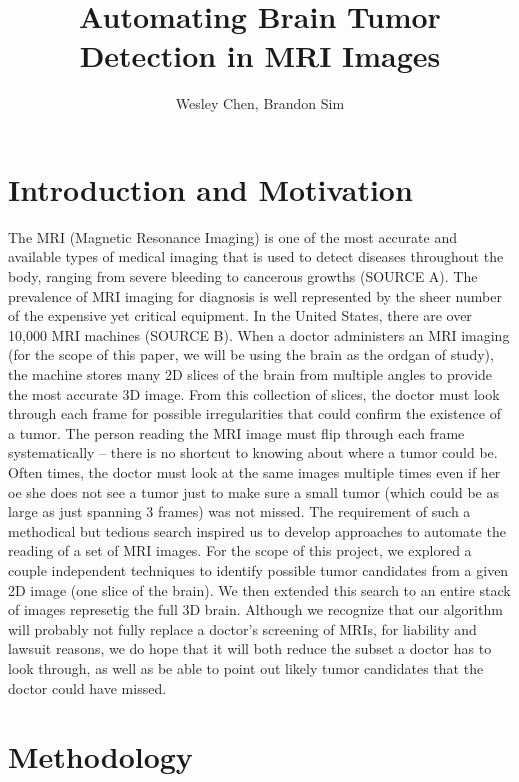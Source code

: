\documentclass[12pt]{article}
\theoremstyle{plain}%
\theoremstyle{definition}
\theoremstyle{remark}
\begin{document}
\title{Automating Brain Tumor Detection in MRI Images}
\author{Wesley Chen, Brandon Sim}

\maketitle
\tableofcontents
\newpage

\section{Introduction and Motivation}

The MRI (Magnetic Resonance Imaging) is one of the most accurate and available types of medical imaging that is used to detect diseases throughout the body, ranging from severe bleeding to cancerous growths (SOURCE A).  The prevalence of MRI imaging for diagnosis is well represented by the sheer number of the expensive yet critical equipment.  In the United States, there are over 10,000 MRI machines (SOURCE B).  When a doctor administers an MRI imaging (for the scope of this paper, we will be using the brain as the ordgan of study), the machine stores many 2D slices of the brain from multiple angles to provide the most accurate 3D image.  From this collection of slices, the doctor must look through each frame for possible irregularities that could confirm the existence of a tumor.  The person reading the MRI image must flip through each frame systematically – there is no shortcut to knowing about where a tumor could be.  Often times, the doctor must look at the same images multiple times even if her oe she does not see a tumor just to make sure a small tumor (which could be as large as just spanning 3 frames) was not missed.  The requirement of such a methodical but tedious search inspired us to develop approaches to automate the reading of a set of MRI images.  For the scope of this project, we explored a couple independent techniques to identify possible tumor candidates from a given 2D image (one slice of the brain).  We then extended this search to an entire stack of images represetig the full 3D brain.  Although we recognize that our algorithm will probably not fully replace a doctor's screening of MRIs, for liability and lawsuit reasons, we do hope that it will both reduce the subset a doctor has to look through, as well as be able to point out likely tumor candidates that the doctor could have missed.

\section{Methodology}
\end{document}
